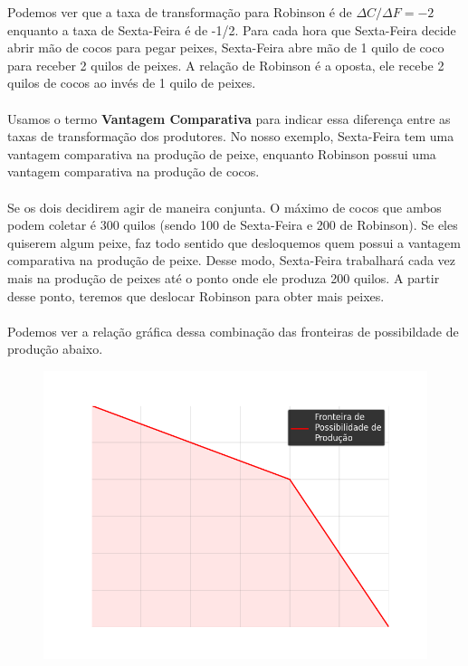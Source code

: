 \documentclass[a4paper,11pt,oneside]{book}
\theoremstyle{definition}
\theoremstyle{break}
\begin{document}
Podemos ver que a taxa de transformação para Robinson é de $\Delta C / \Delta F = -2$ enquanto a taxa de Sexta-Feira é de -1/2. Para cada hora que Sexta-Feira decide abrir mão de cocos para pegar peixes, Sexta-Feira abre mão de 1 quilo de coco para receber 2 quilos de peixes. A relação de Robinson é a oposta, ele recebe 2 quilos de cocos ao invés de 1 quilo de peixes.
\\
\\
Usamos o termo \textbf{Vantagem Comparativa} para indicar essa diferença entre as taxas de transformação dos produtores. No nosso exemplo, Sexta-Feira tem uma vantagem comparativa na produção de peixe, enquanto Robinson possui uma vantagem comparativa na produção de cocos. 
\\
\\
Se os dois decidirem agir de maneira conjunta. O máximo de cocos que ambos podem coletar é 300 quilos (sendo 100 de Sexta-Feira e 200 de Robinson). Se eles quiserem algum peixe, faz todo sentido que desloquemos quem possui a vantagem comparativa na produção de peixe. Desse modo, Sexta-Feira trabalhará cada vez mais na produção de peixes até o ponto onde ele produza 200 quilos. A partir desse ponto, teremos que deslocar Robinson para obter mais peixes.
\\
\\
Podemos ver a relação gráfica dessa combinação das fronteiras de possibildade de produção abaixo.

\begin{figure}[H]
	\centering
	\includegraphics[scale=0.6]{cap33_10-pos_prod2.png}
\end{figure}
\end{document}
